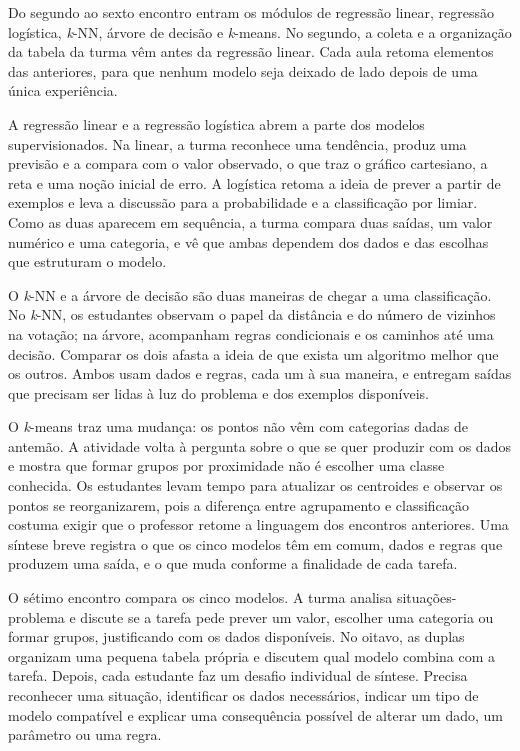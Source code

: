 Do segundo ao sexto encontro entram os módulos de regressão linear, regressão logística, \textit{k}-NN, árvore de decisão e \textit{k}-means. No segundo, a coleta e a organização da tabela da turma vêm antes da regressão linear. Cada aula retoma elementos das anteriores, para que nenhum modelo seja deixado de lado depois de uma única experiência.

A regressão linear e a regressão logística abrem a parte dos modelos supervisionados. Na linear, a turma reconhece uma tendência, produz uma previsão e a compara com o valor observado, o que traz o gráfico cartesiano, a reta e uma noção inicial de erro. A logística retoma a ideia de prever a partir de exemplos e leva a discussão para a probabilidade e a classificação por limiar. Como as duas aparecem em sequência, a turma compara duas saídas, um valor numérico e uma categoria, e vê que ambas dependem dos dados e das escolhas que estruturam o modelo.

O \textit{k}-NN e a árvore de decisão são duas maneiras de chegar a uma classificação. No \textit{k}-NN, os estudantes observam o papel da distância e do número de vizinhos na votação; na árvore, acompanham regras condicionais e os caminhos até uma decisão. Comparar os dois afasta a ideia de que exista um algoritmo melhor que os outros. Ambos usam dados e regras, cada um à sua maneira, e entregam saídas que precisam ser lidas à luz do problema e dos exemplos disponíveis.

O \textit{k}-means traz uma mudança: os pontos não vêm com categorias dadas de antemão. A atividade volta à pergunta sobre o que se quer produzir com os dados e mostra que formar grupos por proximidade não é escolher uma classe conhecida. Os estudantes levam tempo para atualizar os centroides e observar os pontos se reorganizarem, pois a diferença entre agrupamento e classificação costuma exigir que o professor retome a linguagem dos encontros anteriores. Uma síntese breve registra o que os cinco modelos têm em comum, dados e regras que produzem uma saída, e o que muda conforme a finalidade de cada tarefa.

O sétimo encontro compara os cinco modelos. A turma analisa situações-problema e discute se a tarefa pede prever um valor, escolher uma categoria ou formar grupos, justificando com os dados disponíveis. No oitavo, as duplas organizam uma pequena tabela própria e discutem qual modelo combina com a tarefa. Depois, cada estudante faz um desafio individual de síntese. Precisa reconhecer uma situação, identificar os dados necessários, indicar um tipo de modelo compatível e explicar uma consequência possível de alterar um dado, um parâmetro ou uma regra.

